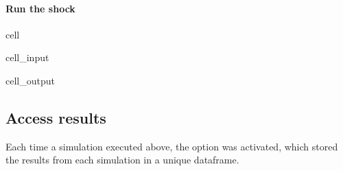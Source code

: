 \documentclass[letterpaper,10pt,english]{jupyterBook}
\begin{document}
\paragraph{Run the shock}
\label{\detokenize{content/06_WBModels/LoadingWBModel:run-the-shock}}
\begin{sphinxuseclass}{cell}\begin{sphinxVerbatimInput}

\begin{sphinxuseclass}{cell_input}
\begin{sphinxVerbatim}[commandchars=\\\{\}]
  
\PYG{p}{[}\PYG{p}{]}
\end{sphinxVerbatim}

\end{sphinxuseclass}\end{sphinxVerbatimInput}
\begin{sphinxVerbatimOutput}

\begin{sphinxuseclass}{cell_output}
\noindent{}

\end{sphinxuseclass}\end{sphinxVerbatimOutput}

\end{sphinxuseclass}

\subsection{Access results}
\label{\detokenize{content/06_WBModels/LoadingWBModel:access-results}}
\sphinxAtStartPar
Each time a simulation executed above, the  option was activated, which stored the results from each simulation in a unique dataframe.
\end{document}
